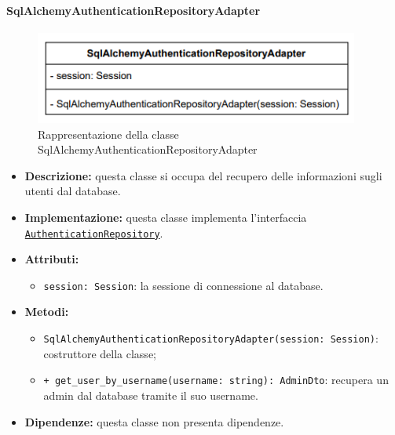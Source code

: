 \paragraph{SqlAlchemyAuthenticationRepositoryAdapter} \label{SqlAlchemyAuthenticationRepositoryAdapter}
\begin{figure}[H]
    \centering
    \includegraphics[width=0.95\textwidth]{assets/Backend/sql_alchemy_authentication_repository_adapter.png}
    \caption{Rappresentazione della classe SqlAlchemyAuthenticationRepositoryAdapter}
  \end{figure}
\begin{itemize}
    \item \textbf{Descrizione:} questa classe si occupa del recupero delle informazioni sugli utenti dal database.
    \item \textbf{Implementazione:} questa classe implementa l'interfaccia \hyperref[AuthenticationRepository]{\texttt{AuthenticationRepository}}.
    \item \textbf{Attributi:}
    \begin{itemize}
        \item \texttt{session: Session}: la sessione di connessione al database.
    \end{itemize}
    \item \textbf{Metodi:}
    \begin{itemize}
        \item \texttt{SqlAlchemyAuthenticationRepositoryAdapter(session: Session)}: costruttore della classe;
        \item \texttt{+ get\_user\_by\_username(username: string): AdminDto}: recupera un admin dal database tramite il suo username.
    \end{itemize}
    \item \textbf{Dipendenze:} questa classe non presenta dipendenze.
\end{itemize} 


